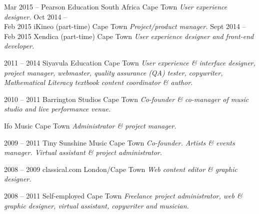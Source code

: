 \documentclass[]{friggeri-cv} %
\begin{document}
\begin{entrylist}
\entry
{Mar 2015 -- }
{Pearson Education South Africa}
{Cape Town}
{\emph{User experience designer.}}
\entry
{Oct 2014 -- \\ Feb 2015}
{iKineo (part-time)}
{Cape Town}
{\emph{Project/product manager.}}
\entry
{Sept 2014 -- \\Feb 2015}
{Xendica (part-time)}
{Cape Town}
{\emph{User experience designer and front-end developer.}}

\entry
{2011 -- 2014}
{Siyavula Education}
{Cape Town}
{\emph{User experience \& interface designer, project manager, webmaster, quality assurance (QA) tester, copywriter, Mathematical Literacy textbook content coordinator \& author.}}

\entry
{2010 -- 2011}
{Barrington Studios}
{Cape Town}
{\emph{Co-founder \& co-manager of music studio and live performance venue.}}



\entry
{}
{Ifo Music}
{Cape Town}
{\emph{Administrator \& project manager.}}

\entry
{2009 -- 2011}
{Tiny Sunshine Music}
{Cape Town}
{\emph{Co-founder. Artists \& events manager. Virtual assistant \& project administrator.}}


\entry
{2008 -- 2009}
{classical.com}
{London/Cape Town}
{\emph{Web content editor \& graphic designer.}}


\entry
{2008 -- 2011}
{Self-employed}
{Cape Town}
{\emph{Freelance project administrator, web \& graphic designer, virtual assistant, copywriter and musician.}}

\end{entrylist}
\pagebreak
\end{document}
